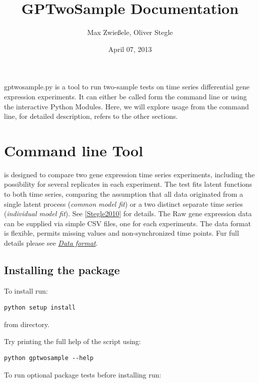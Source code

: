 \documentclass[letterpaper,10pt,english]{sphinxmanual}
\title{GPTwoSample Documentation}
\date{April 07, 2013}
\author{Max Zwießele, Oliver Stegle}
\begin{document}
\maketitle
\tableofcontents
{}\label{index::doc}


gptwosample.py is a tool to run two-sample tests on time series
differential gene expression experiments. It can either be called form
the command line or using the interactive Python Modules. Here, we
will explore usage from the command line, for detailed description,
refers to the other sections.


\chapter{Command line Tool}
\label{index:command-line-tool}\label{index:welcome-to-gptwosample}
 is designed to compare two gene expression time series
experiments, including the possibility for several replicates in each
experiment. The test fits latent functions to both time series,
comparing the assumption that all data originated from a single latent
process (\emph{common model fit}) or a two distinct separate time series
(\emph{individual model fit}). See {\hyperref[index:stegle2010]{{[}Stegle2010{]}}} for details. The Raw gene expression data can
be supplied via simple CSV files, one for each experiments. The data
format is flexible, permits missing values and non-synchronized time
points. Fur full details please see {\hyperref[usage:dataformat]{\emph{Data format}}}.


\section{Installing the package}
\label{index:installing-the-package}\label{index:install}
To install  run:

\begin{Verbatim}[commandchars=\\\{\}]
python setup install
\end{Verbatim}

from  directory.

Try printing the full help of the script using:

\begin{Verbatim}[commandchars=\\\{\}]
python gptwosample --help
\end{Verbatim}

To run optional package tests before installing run:
\end{document}
